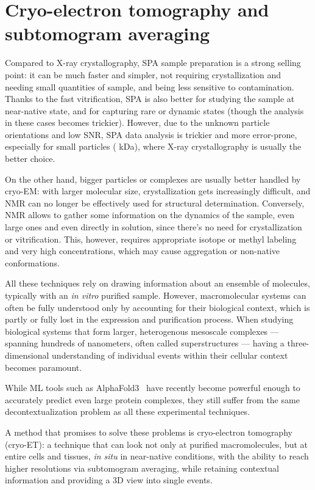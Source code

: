\chapter[Cryo-ET and STA]{Cryo-electron tomography and subtomogram averaging}\label{et}

Compared to X-ray crystallography, SPA sample preparation is a strong selling point: it can be much faster and simpler, not requiring crystallization and needing small quantities of sample, and being less sensitive to contamination.
Thanks to the fast vitrification, SPA is also better for studying the sample at near-native state, and for capturing rare or dynamic states (though the analysis in these cases becomes trickier).
However, due to the unknown particle orientations and low SNR, SPA data analysis is trickier and more error-prone, especially for small particles ( kDa), where X-ray crystallography is usually the better choice.

On the other hand, bigger particles or complexes are usually better handled by cryo-EM: with larger molecular size, crystallization gets increasingly difficult, and NMR can no longer be effectively used for structural determination.
Conversely, NMR allows to gather some information on the dynamics of the sample, even large ones and even directly in solution, since there's no need for crystallization or vitrification.
This, however, requires appropriate isotope or methyl labeling and very high concentrations, which may cause aggregation or non-native conformations.

All these techniques rely on drawing information about an ensemble of mole\-cules, typically with an \textit{in vitro} purified sample.
However, macromolecular systems can often be fully understood only by accounting for their biological context, which is partly or fully lost in the expression and purification process.
When studying biological systems that form larger, heterogenous mesoscale complexes --- spanning hundreds of nanometers, often called superstructures --- having a three-dimensional understanding of individual events within their cellular context becomes paramount.

While ML tools such as AlphaFold3~\cite{abramsonAccurateStructurePrediction2024} have recently become powerful enough to accurately predict even large protein complexes, they still suffer from the same decontextualization problem as all these experimental techniques.

A method that promises to solve these problems is cryo-electron tomography (cryo-ET): a technique that can look not only at purified macromolecules, but at entire cells and tissues, \textit{in situ} in near-native conditions, with the ability to reach higher resolutions via subtomogram averaging, while retaining contextual information and providing a 3D view into single events.

